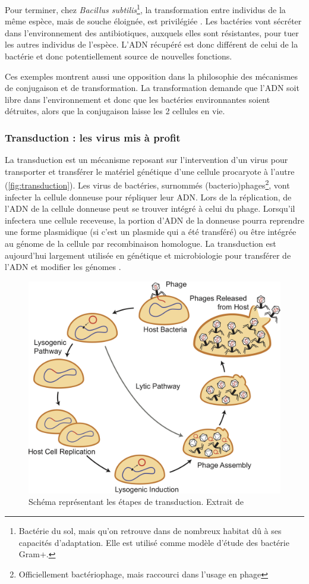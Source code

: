 Pour terminer, chez \textit{Bacillus subtilis}\footnote{Bactérie du sol, mais qu'on retrouve dans de nombreux habitat dû à ses capacités d'adaptation. Elle est utilisé comme modèle d'étude des bactérie Gram+.}, la transformation entre individus de la même espèce, mais de souche éloignée, est privilégiée \cite{lyons_combinatorial_2016}. Les bactéries vont sécréter dans l'environnement des antibiotiques, auxquels elles sont résistantes, pour tuer les autres individus de l'espèce. L'ADN récupéré est donc différent de celui de la bactérie et donc potentiellement source de nouvelles fonctions.

Ces exemples montrent aussi une opposition dans la philosophie des mécanismes de conjugaison et de transformation. La transformation demande que l'ADN soit libre dans l'environnement et donc que les bactéries environnantes soient détruites, alors que la conjugaison laisse les 2 cellules en vie. 


\subsubsection{Transduction : les virus mis à profit}

La transduction est un mécanisme reposant sur l'intervention d'un virus pour transporter et transférer le matériel génétique d'une cellule procaryote à l'autre (\autoref{fig:transduction}). Les virus de bactéries, surnommés (bacterio)phages\footnote{Officiellement bactériophage, mais raccourci dans l'usage en phage}, vont infecter la cellule donneuse pour répliquer leur ADN. Lors de la réplication, de l'ADN de la cellule donneuse peut se trouver intégré à celui du phage. Lorsqu'il infectera une cellule receveuse, la portion d'ADN de la donneuse pourra reprendre une forme plasmidique (si c'est un plasmide qui a été transféré) ou être intégrée au génome de la cellule par recombinaison homologue. La transduction est aujourd'hui largement utilisée en génétique et microbiologie pour transférer de l'ADN et modifier les génomes \cite{wang_phage-based_2024}. 

\begin{figure}[htbp]
    \centering
    \includegraphics[width=0.65\linewidth]{images/transduction.png}
    \caption[Schéma synthétique de la transduction]{Schéma représentant les étapes de transduction. Extrait de \cite{chiang_genetic_2019}}
    \label{fig:transduction}
\end{figure}

